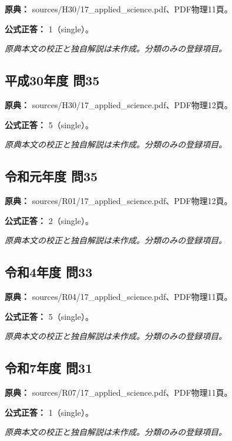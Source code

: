 \noindent\textbf{原典：} sources/H30/17\_applied\_science.pdf、PDF物理11頁。

\textbf{公式正答：} 1（single）。

\par\textit{原典本文の校正と独自解説は未作成。分類のみの登録項目。}

\subsection{平成30年度 問35}
\label{q:h30-reg-applied-35}

\noindent\textbf{原典：} sources/H30/17\_applied\_science.pdf、PDF物理12頁。

\textbf{公式正答：} 5（single）。

\par\textit{原典本文の校正と独自解説は未作成。分類のみの登録項目。}

\subsection{令和元年度 問35}
\label{q:r01-reg-applied-35}

\noindent\textbf{原典：} sources/R01/17\_applied\_science.pdf、PDF物理12頁。

\textbf{公式正答：} 2（single）。

\par\textit{原典本文の校正と独自解説は未作成。分類のみの登録項目。}

\subsection{令和4年度 問33}
\label{q:r04-reg-applied-33}

\noindent\textbf{原典：} sources/R04/17\_applied\_science.pdf、PDF物理11頁。

\textbf{公式正答：} 5（single）。

\par\textit{原典本文の校正と独自解説は未作成。分類のみの登録項目。}

\subsection{令和7年度 問31}
\label{q:r07-reg-applied-31}

\noindent\textbf{原典：} sources/R07/17\_applied\_science.pdf、PDF物理11頁。

\textbf{公式正答：} 1（single）。

\par\textit{原典本文の校正と独自解説は未作成。分類のみの登録項目。}

